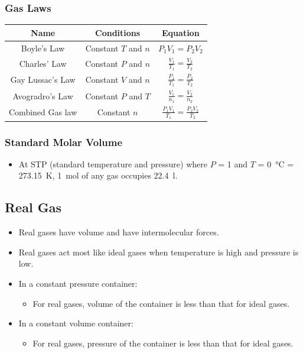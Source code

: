 \documentclass{article}
\begin{document}
\subsubsection{Gas Laws}

\begin{center}
    \renewcommand{\arraystretch}{2}
    \begin{tabular}{|c|c|c|}
        \hline
        Name & Conditions & Equation \\
        \hline 
        Boyle's Law & Constant $T$ and $n$ & $P_1V_1 = P_2V_2$ \\
        \hline
        Charles' Law & Constant $P$ and $n$ & $\frac{V_1}{T_1} = \frac{V_2}{T_2}$ \\
        \hline
        Gay Lussac's Law & Constant $V$ and $n$ & $\frac{P_1}{T_1} = \frac{P_2}{T_2}$ \\
        \hline
        Avogradro's Law & Constant $P$ and $T$ & $\frac{V_1}{n_1} = \frac{V_2}{n_2}$ \\
        \hline
        Combined Gas law & Constant $n$ & $\frac{P_1V_1}{T_1} = \frac{P_2V_2}{T_2}$ \\
        \hline
    \end{tabular}
\end{center}

\subsubsection{Standard Molar Volume}

\begin{itemize}
    \item At STP (standard temperature and pressure) where $P$ = \SI{1}{\atm} and $T$ = \SI{0}{\celsius} = \SI{273.15}{\kelvin}, \SI{1}{\mole} of any gas occupies \SI{22.4}{\litre}.
\end{itemize}

\subsection{Real Gas}

\begin{itemize}
    \item Real gases have volume and have intermolecular forces.
    \item Real gases act most like ideal gases when temperature is high and pressure is low.
    \item In a constant pressure container:
    \begin{itemize}
        \item For real gases, volume of the container is less than that for ideal gases.
    \end{itemize}
    \item In a constant volume container:
    \begin{itemize}
        \item For real gases, pressure of the container is less than that for ideal gases.
    \end{itemize}
\end{itemize}
\end{document}
